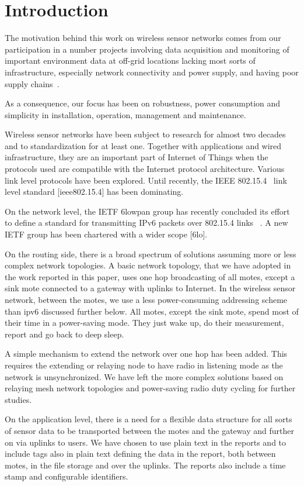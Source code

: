 \documentclass[conference, a4paper,10pt,twocolumn]{IEEEtran}
\begin{document}
\section{Introduction}
\label{sec:intro}
 
The motivation behind this work on wireless sensor networks comes from 
our participation in a number projects involving data acquisition and 
monitoring of important environment data at off-grid locations lacking 
most sorts of infrastructure, especially network connectivity and power 
supply, and having poor supply chains~\cite{UBIQUI}.

As a consequence, our focus has been on robustness, power consumption 
and simplicity in installation, operation, management and maintenance.

Wireless sensor networks have been subject to research for almost two 
decades and to standardization for at least one. Together with 
applications and wired infrastructure, they are an important part of 
Internet of Things when the protocols used are compatible with the 
Internet protocol architecture. Various link level protocols have been 
explored. Until recently, the IEEE 802.15.4~\cite{802154}  link level 
standard [ieee802.15.4] has been dominating.

On the network level, the IETF 6lowpan group has recently concluded its 
effort to define a standard for transmitting IPv6 packets over 802.15.4 
links ~\cite{6LOWPAN}. A new IETF group has been chartered with a wider scope 
[6lo].

On the routing side, there is a broad spectrum of solutions assuming 
more or less complex network topologies.  A basic network topology, that 
we have adopted in the work reported in this paper, uses one hop 
broadcasting of all motes, except a sink mote connected to a gateway 
with uplinks to Internet. In the wireless sensor network, between the 
motes, we use a less power-consuming addressing scheme than ipv6 
discussed further below. All motes, except the sink mote, spend most of 
their time in a power-saving mode. They just wake up, do their 
measurement, report and go back to deep sleep. 

A simple mechanism to extend the network over one hop has been added.
This requires the extending or relaying node to have radio in listening 
mode as the network is unsynchronized. We have left the more complex 
solutions based on relaying mesh network topologies and power-saving 
radio duty cycling for further studies.

On the application level, there is a need for a flexible data structure 
for all sorts of sensor data to be transported between the motes and the 
gateway and further on via uplinks to users. We have chosen to use plain 
text in the reports and to include tags also in plain text defining the 
data in the report, both between motes, in the file storage and over the 
uplinks. The reports also include a time stamp and configurable 
identifiers. 
\end{document}
